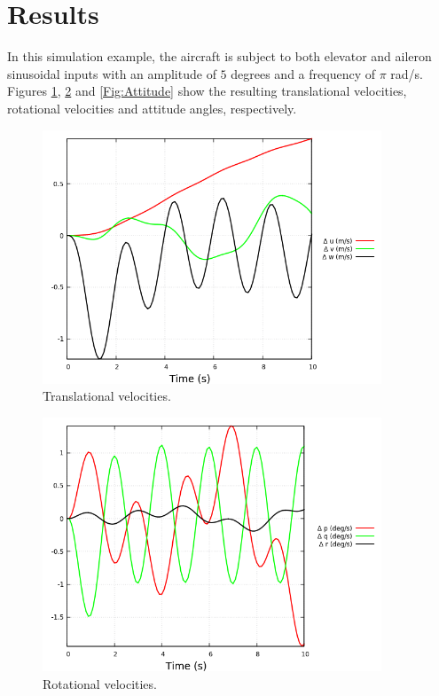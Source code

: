 \documentclass{article}
\begin{document}
\section{Results}
In this simulation example, the aircraft is subject to both elevator and aileron sinusoidal inputs
 with an amplitude of $5$ degrees and a frequency of $\pi$ rad/s. Figures \ref{Fig:Translational_Velocities}, 
 \ref{Fig:Rotational_Velocities} and \ref{Fig:Attitude} show the resulting translational velocities, 
 rotational velocities and attitude angles, respectively.
\begin{figure}[h]
    \centering
    \includegraphics[width=0.9\textwidth]{sim_results_uvw.png}
    \caption{Translational velocities.}
    \label{Fig:Translational_Velocities}
\end{figure}
\begin{figure}[h]
    \centering
    \includegraphics[width=0.9\textwidth]{sim_results_pqr.png}
    \caption{Rotational velocities.}
    \label{Fig:Rotational_Velocities}
\end{figure}
\end{document}
